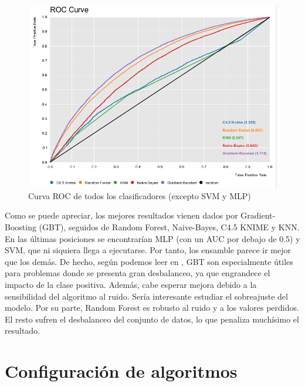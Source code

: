 \begin{figure}[H] %
	\centering
	\includegraphics[scale=0.38]{roc-all-p.png}  %
	\caption{Curva ROC de todos los clasificadores (excepto SVM y MLP)} 
	\label{fig:rocall-p}
\end{figure}

Como se puede apreciar, los mejores resultados vienen dados por Gradient-Boosting (GBT), seguidos de Random Forest, Naive-Bayes, C4.5 KNIME y KNN. En las últimas posiciones se encontrarían MLP (con un AUC por debajo de 0.5) y SVM, que ni siquiera llega a ejecutarse. Por tanto, los ensamble parece ir mejor que los demás. De hecho, según podemos leer en \cite{friedman}, GBT son especialmente útiles para problemas donde se presenta gran desbalanceo, ya que engrandece el impacto de la clase positiva. Además, cabe esperar mejora debido a la sensibilidad del algoritmo al ruido. Sería interesante estudiar el sobreajuste del modelo. Por su parte, Random Forest es robusto al ruido y a los valores perdidos. El resto sufren el desbalanceo del conjunto de datos, lo que penaliza muchísimo el resultado. 




\section{Configuración de algoritmos}



